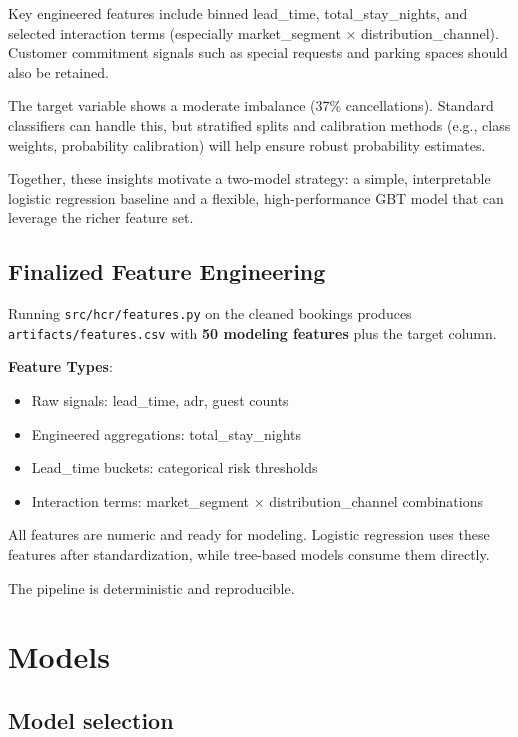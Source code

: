 \documentclass[
  letterpaper,
  DIV=11,
  numbers=noendperiod]{scrartcl}
\providecommand{\tightlist}{%
  \setlength{\itemsep}{0pt}\setlength{\parskip}{0pt}}
\begin{document}
Key engineered features include binned lead\_time, total\_stay\_nights,
and selected interaction terms (especially market\_segment ×
distribution\_channel). Customer commitment signals such as special
requests and parking spaces should also be retained.

The target variable shows a moderate imbalance (37\% cancellations).
Standard classifiers can handle this, but stratified splits and
calibration methods (e.g., class weights, probability calibration) will
help ensure robust probability estimates.

Together, these insights motivate a two-model strategy: a simple,
interpretable logistic regression baseline and a flexible,
high-performance GBT model that can leverage the richer feature set.

\subsection{Finalized Feature
Engineering}\label{finalized-feature-engineering}

Running \texttt{src/hcr/features.py} on the cleaned bookings produces
\texttt{artifacts/features.csv} with \textbf{50 modeling features} plus
the target column.

\textbf{Feature Types}:

\begin{itemize}
\tightlist
\item
  Raw signals: lead\_time, adr, guest counts
\item
  Engineered aggregations: total\_stay\_nights
\item
  Lead\_time buckets: categorical risk thresholds
\item
  Interaction terms: market\_segment × distribution\_channel
  combinations
\end{itemize}

All features are numeric and ready for modeling. Logistic regression
uses these features after standardization, while tree-based models
consume them directly.

The pipeline is deterministic and reproducible.

\section{Models}\label{models}

\subsection{Model selection}\label{model-selection}
\end{document}
